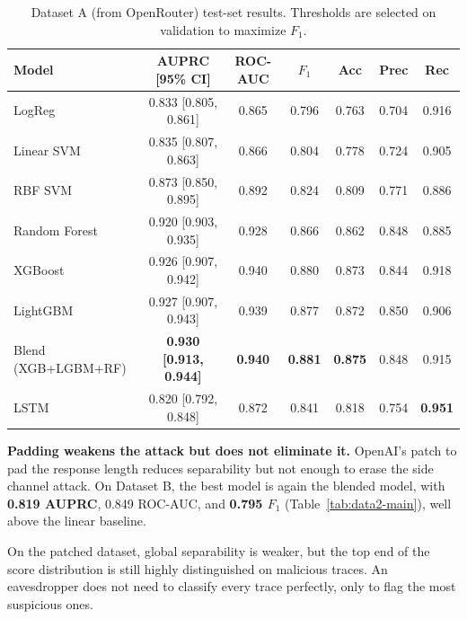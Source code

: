 \begin{table}[t]
\centering
\caption{Dataset A (from OpenRouter) test-set results. Thresholds are selected on validation to maximize $F_1$.}
\label{tab:data1-main}
\begin{tabular}{lcccccc}
\hline
Model & AUPRC [95\% CI] & ROC-AUC & $F_1$ & Acc & Prec & Rec \\
\hline
LogReg & 0.833 [0.805, 0.861] & 0.865 & 0.796 & 0.763 & 0.704 & 0.916 \\
Linear SVM & 0.835 [0.807, 0.863] & 0.866 & 0.804 & 0.778 & 0.724 & 0.905 \\
RBF SVM & 0.873 [0.850, 0.895] & 0.892 & 0.824 & 0.809 & 0.771 & 0.886 \\
Random Forest & 0.920 [0.903, 0.935] & 0.928 & 0.866 & 0.862 & 0.848 & 0.885 \\
XGBoost & 0.926 [0.907, 0.942] & 0.940 & 0.880 & 0.873 & 0.844 & 0.918 \\
LightGBM & 0.927 [0.907, 0.943] & 0.939 & 0.877 & 0.872 & 0.850 & 0.906 \\
Blend (XGB+LGBM+RF) & \textbf{0.930 [0.913, 0.944]} & \textbf{0.940} & \textbf{0.881} & \textbf{0.875} & 0.848 & 0.915 \\
LSTM & 0.820 [0.792, 0.848] & 0.872 & 0.841 & 0.818 & 0.754 & \textbf{0.951} \\
\hline
\end{tabular}
\end{table}

\textbf{Padding weakens the attack but does not eliminate it.}
OpenAI's patch to pad the response length reduces separability but not enough to erase the side channel attack. On Dataset B, the best model is again the blended model, with \textbf{0.819 AUPRC}, 0.849 ROC-AUC, and \textbf{0.795 $F_1$} (Table~\ref{tab:data2-main}), well above the linear baseline.

On the patched dataset, global separability is weaker, but the top end of the score distribution is still highly distinguished on malicious traces. An eavesdropper does not need to classify every trace perfectly, only to flag the most suspicious ones.

